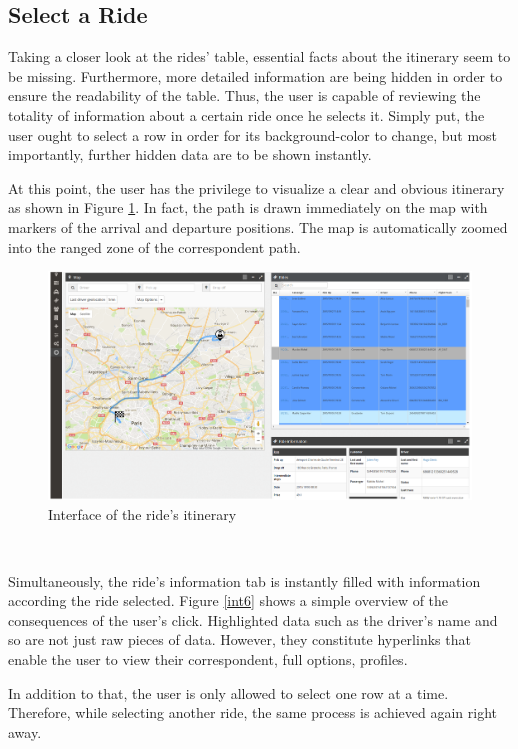 \subsection{Select a Ride  }

Taking a closer look at the rides' table, essential facts about the itinerary seem to be missing. Furthermore, more detailed information are being hidden in order to ensure the readability of the table.
Thus, the user is capable of reviewing the totality of information about a certain ride once he selects it. 
Simply put, the user ought to select a row in order for its background-color to change, but most importantly, further hidden data are to be shown instantly.

At this point, the user has the privilege to visualize a clear and obvious itinerary as shown in Figure \ref{int5}. In fact, the path is drawn immediately on the map with markers of the arrival and departure positions. The map is automatically zoomed into the ranged zone of the correspondent path.


\begin{figure}[!htbp] 
\begin{center}
\includegraphics[width=6 in]{images/achievement/5.png}
\caption{Interface of the ride's itinerary }
\label{int5}
\end{center}
\end{figure}~


Simultaneously, the ride's information tab is instantly filled with information according the ride selected. Figure \ref{int6} shows a simple overview of the consequences of the user's click. Highlighted data such as the driver's  name and so are not just raw pieces of data. However, they constitute hyperlinks that enable the user to view their correspondent, full options, profiles. 

In addition to that, the user is only allowed to select one row at a time. Therefore, while selecting another ride, the same process is achieved again right away.



